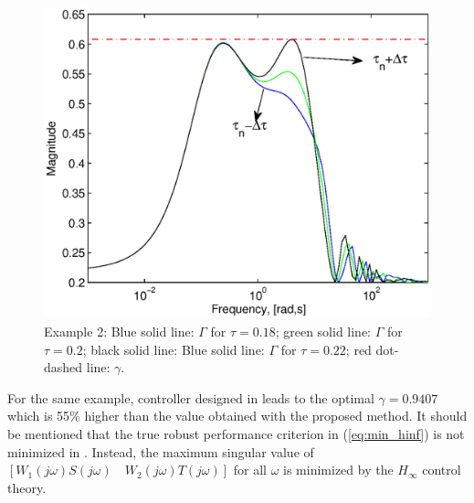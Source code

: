 \documentclass[default]{svmult}
\begin{document}
\begin{figure}[!h]
\centering
\includegraphics[width=0.7\columnwidth]{fig/shaped_sensitivity}
\caption{Example 2: Blue solid line: $\Gamma$ for $\tau=0.18$; green solid line: $\Gamma$ for $\tau=0.2$;  black solid line: Blue solid line: $\Gamma$ for $\tau=0.22$; red dot-dashed line: $\gamma$.}
\label{fig:example3}
\end{figure}


For the same example, controller designed in \cite{MZ00} leads to  the optimal $\gamma = 0.9407$ which is 55\% higher than the value obtained with the proposed method. It should be mentioned that the true robust performance criterion in (\ref{eq:min_hinf}) is not minimized in \cite{MZ00}. Instead, the maximum singular value of $[W_1(j\omega)S(j\omega) \quad W_2(j\omega)T(j\omega)]$ for all $\omega$ is minimized by the $H_\infty$ control theory. 
 

%
\end{document}

